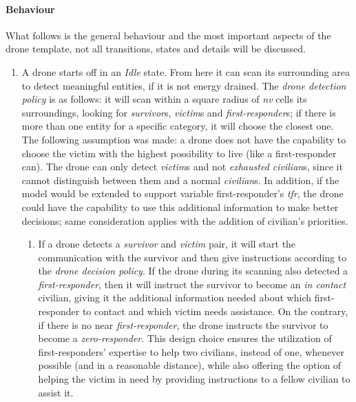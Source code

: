 \paragraph{Behaviour}
What follows is the general behaviour and the most important aspects of the drone template, not all transitions, states and details will be discussed.

\begin{enumerate}
	\item A drone starts off in an \textit{Idle} state. From here it can scan its surrounding area to detect meaningful entities, if it is not energy drained. The \textit{drone detection policy} is as follows: it will scan within a square radius of \textit{nv} cells its surroundings, looking for \textit{survivor}s, \textit{victim}s and \textit{first-responder}s; if there is more than one entity for a specific category, it will choose the closest one. The following assumption was made: a drone does not have the capability to choose the victim with the highest possibility to live (like a first-responder can). The drone can only detect \textit{victim}s and not \textit{exhausted civilian}s, since it cannot distinguish between them and a normal \textit{civilian}s. In addition, if the model would be extended to support variable first-responder's \textit{tfr}, the drone could have the capability to use this additional information to make better decisions; same consideration applies with the addition of civilian's priorities.
		\begin{enumerate}
		\item If a drone detects a \textit{survivor} and \textit{victim} pair, it will start the communication with the survivor and then give instructions according to the \textit{drone decision policy}. If the drone during its scanning also detected a \textit{first-responder}, then it will instruct the survivor to become an \textit{in contact} civilian, giving it the additional information needed about which first-responder to contact and which victim needs assistance. On the contrary, if there is no near \textit{first-responder}, the drone instructs the survivor to become a \textit{zero-responder}. This design choice ensures the utilization of first-responders' expertise to help two civilians, instead of one, whenever possible (and in a reasonable distance), while also offering the option of helping the victim in need by providing instructions to a fellow civilian to assist it.
		

\end{enumerate}
\end{enumerate}
